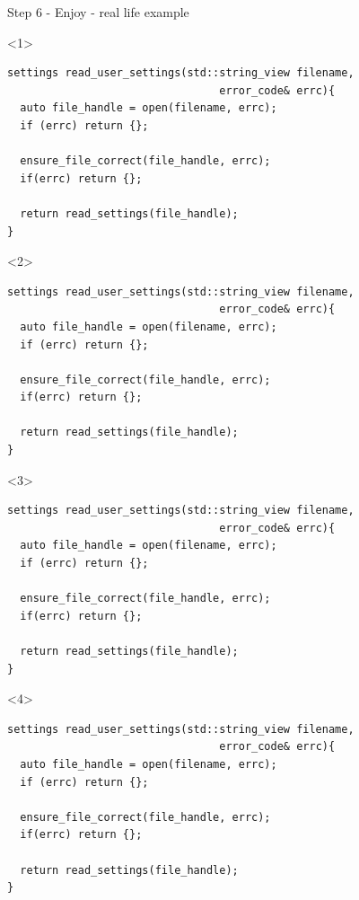 \documentclass[10pt]{beamer}
\begin{document}
\begin{frame}[fragile]{Step 6 - Enjoy - real life example}
	\begin{onlyenv}
	\begin{verbatim}
settings read_user_settings(std::string_view filename,
	                             error_code& errc){
  auto file_handle = open(filename, errc);
  if (errc) return {};

  ensure_file_correct(file_handle, errc);
  if(errc) return {};

  return read_settings(file_handle);
}
	\end{verbatim}
	\end{onlyenv}

	\begin{onlyenv}
	\begin{verbatim}
settings read_user_settings(std::string_view filename,
	                             error_code& errc){
  auto file_handle = open(filename, errc);
  if (errc) return {};

  ensure_file_correct(file_handle, errc);
  if(errc) return {};

  return read_settings(file_handle);
}
	\end{verbatim}
	\end{onlyenv}

	\begin{onlyenv}
	\begin{verbatim}
settings read_user_settings(std::string_view filename,
	                             error_code& errc){
  auto file_handle = open(filename, errc);
  if (errc) return {};

  ensure_file_correct(file_handle, errc);
  if(errc) return {};

  return read_settings(file_handle);
}
	\end{verbatim}
	\end{onlyenv}

	\begin{onlyenv}
	\begin{verbatim}
settings read_user_settings(std::string_view filename,
	                             error_code& errc){
  auto file_handle = open(filename, errc);
  if (errc) return {};

  ensure_file_correct(file_handle, errc);
  if(errc) return {};

  return read_settings(file_handle);
}
	\end{verbatim}
	\end{onlyenv}
\end{frame}
	
\end{document}
